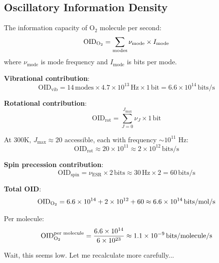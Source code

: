 \documentclass[11pt,onecolumn]{article}
\begin{document}
\subsection{Oscillatory Information Density}

\begin{definition}
The information capacity of O$_2$ molecule per second:
\begin{equation}
\text{OID}_{\ce{O2}} = \sum_{\text{modes}} \nu_{\text{mode}} \times I_{\text{mode}}
\end{equation}
where $\nu_{\text{mode}}$ is mode frequency and $I_{\text{mode}}$ is bits per mode.
\end{definition}

\textbf{Vibrational contribution}:
\begin{equation}
\text{OID}_{\text{vib}} = 14\,\text{modes} \times 4.7 \times 10^{13}\,\text{Hz} \times 1\,\text{bit} = 6.6 \times 10^{14}\,\text{bits/s}
\end{equation}

\textbf{Rotational contribution}:
\begin{equation}
\text{OID}_{\text{rot}} = \sum_{J=0}^{J_{\max}} \nu_J \times 1\,\text{bit}
\end{equation}

At 300K, $J_{\max} \approx 20$ accessible, each with frequency $\sim 10^{11}$ Hz:
\begin{equation}
\text{OID}_{\text{rot}} \approx 20 \times 10^{11} \approx 2 \times 10^{12}\,\text{bits/s}
\end{equation}

\textbf{Spin precession contribution}:
\begin{equation}
\text{OID}_{\text{spin}} = \nu_{\text{ESR}} \times 2\,\text{bits} \approx 30\,\text{Hz} \times 2 = 60\,\text{bits/s}
\end{equation}

\textbf{Total OID}:
\begin{equation}
\text{OID}_{\ce{O2}} = 6.6 \times 10^{14} + 2 \times 10^{12} + 60 \approx 6.6 \times 10^{14}\,\text{bits/mol/s}
\end{equation}

Per molecule:
\begin{equation}
\text{OID}_{\ce{O2}}^{\text{per molecule}} = \frac{6.6 \times 10^{14}}{6 \times 10^{23}} \approx 1.1 \times 10^{-9}\,\text{bits/molecule/s}
\end{equation}

Wait, this seems low. Let me recalculate more carefully...
\end{document}
